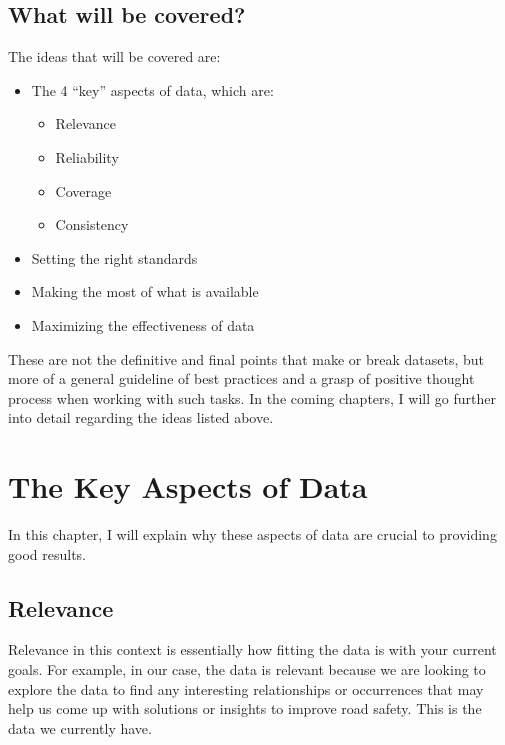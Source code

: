 \documentclass[
]{book}
\providecommand{\tightlist}{%
  \setlength{\itemsep}{0pt}\setlength{\parskip}{0pt}}
\begin{document}
\hypertarget{what-will-be-covered}{%
\section{What will be covered?}\label{what-will-be-covered}}

The ideas that will be covered are:

\begin{itemize}
\tightlist
\item
  The 4 ``key'' aspects of data, which are:

  \begin{itemize}
  \tightlist
  \item
    Relevance
  \item
    Reliability
  \item
    Coverage
  \item
    Consistency
  \end{itemize}
\item
  Setting the right standards
\item
  Making the most of what is available
\item
  Maximizing the effectiveness of data
\end{itemize}

These are not the definitive and final points that make or break datasets, but more of a general guideline of best practices and a grasp of positive thought process when working with such tasks. In the coming chapters, I will go further into detail regarding the ideas listed above.

\hypertarget{the-key-aspects-of-data}{%
\chapter{The Key Aspects of Data}\label{the-key-aspects-of-data}}

In this chapter, I will explain why these aspects of data are crucial to providing good results.

\hypertarget{relevance}{%
\section{Relevance}\label{relevance}}

Relevance in this context is essentially how fitting the data is with your current goals. For example, in our case, the data is relevant because we are looking to explore the data to find any interesting relationships or occurrences that may help us come up with solutions or insights to improve road safety. This is the data we currently have.
\end{document}
